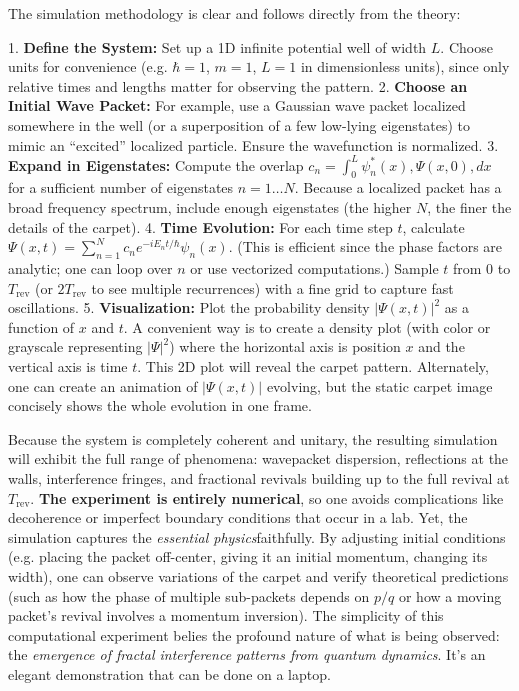 \documentclass[11pt,a4paper]{article}
\begin{document}
The simulation methodology is clear and follows directly from the theory:

1. \textbf{Define the System:} Set up a 1D infinite potential well of width $L$. Choose units for convenience (e.g. $\hbar=1$, $m=1$, $L=1$ in dimensionless units), since only relative times and lengths matter for observing the pattern.
2. \textbf{Choose an Initial Wave Packet:} For example, use a Gaussian wave packet localized somewhere in the well (or a superposition of a few low-lying eigenstates) to mimic an “excited” localized particle. Ensure the wavefunction is normalized.
3. \textbf{Expand in Eigenstates:} Compute the overlap $c_n = \int_0^L \psi_n^*(x),\Psi(x,0),dx$ for a sufficient number of eigenstates $n=1\ldots N$. Because a localized packet has a broad frequency spectrum, include enough eigenstates (the higher $N$, the finer the details of the carpet).
4. \textbf{Time Evolution:} For each time step $t$, calculate $\Psi(x,t)=\sum_{n=1}^N c_n e^{-iE_n t/\hbar}\psi_n(x)$. (This is efficient since the phase factors are analytic; one can loop over $n$ or use vectorized computations.) Sample $t$ from $0$ to $T_{\text{rev}}$ (or $2T_{\text{rev}}$ to see multiple recurrences) with a fine grid to capture fast oscillations.
5. \textbf{Visualization:} Plot the probability density $|\Psi(x,t)|^2$ as a function of $x$ and $t$. A convenient way is to create a density plot (with color or grayscale representing $|\Psi|^2$) where the horizontal axis is position $x$ and the vertical axis is time $t$. This 2D plot will reveal the carpet pattern. Alternately, one can create an animation of $|\Psi(x,t)|$ evolving, but the static carpet image concisely shows the whole evolution in one frame.

Because the system is completely coherent and unitary, the resulting simulation will exhibit the full range of phenomena: wavepacket dispersion, reflections at the walls, interference fringes, and fractional revivals building up to the full revival at $T_{\text{rev}}$. \textbf{The experiment is entirely numerical}, so one avoids complications like decoherence or imperfect boundary conditions that occur in a lab. Yet, the simulation captures the \emph{essential physics}faithfully. By adjusting initial conditions (e.g. placing the packet off-center, giving it an initial momentum, changing its width), one can observe variations of the carpet and verify theoretical predictions (such as how the phase of multiple sub-packets depends on $p/q$ or how a moving packet’s revival involves a momentum inversion). The simplicity of this computational experiment belies the profound nature of what is being observed: the \emph{emergence of fractal interference patterns from quantum dynamics}. It’s an elegant demonstration that can be done on a laptop.
\end{document}
